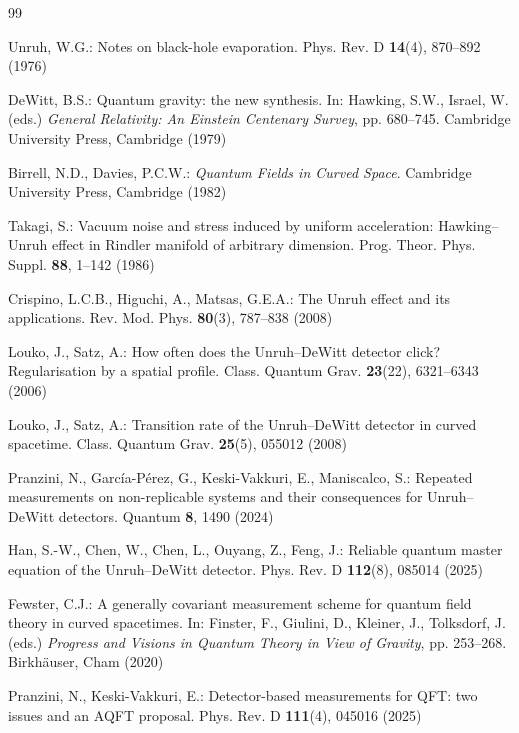 
\begin{thebibliography}{99}

Unruh, W.G.: Notes on black-hole evaporation. Phys. Rev. D \textbf{14}(4), 870--892 (1976)

DeWitt, B.S.: Quantum gravity: the new synthesis. In: Hawking, S.W., Israel, W. (eds.) \emph{General Relativity: An Einstein Centenary Survey}, pp. 680--745. Cambridge University Press, Cambridge (1979)

Birrell, N.D., Davies, P.C.W.: \emph{Quantum Fields in Curved Space}. Cambridge University Press, Cambridge (1982)

Takagi, S.: Vacuum noise and stress induced by uniform acceleration: Hawking--Unruh effect in Rindler manifold of arbitrary dimension. Prog. Theor. Phys. Suppl. \textbf{88}, 1--142 (1986)

Crispino, L.C.B., Higuchi, A., Matsas, G.E.A.: The Unruh effect and its applications. Rev. Mod. Phys. \textbf{80}(3), 787--838 (2008)

Louko, J., Satz, A.: How often does the Unruh--DeWitt detector click? Regularisation by a spatial profile. Class. Quantum Grav. \textbf{23}(22), 6321--6343 (2006)

Louko, J., Satz, A.: Transition rate of the Unruh--DeWitt detector in curved spacetime. Class. Quantum Grav. \textbf{25}(5), 055012 (2008)

Pranzini, N., Garc\'ia-P\'erez, G., Keski-Vakkuri, E., Maniscalco, S.: Repeated measurements on non-replicable systems and their consequences for Unruh--DeWitt detectors. Quantum \textbf{8}, 1490 (2024)

Han, S.-W., Chen, W., Chen, L., Ouyang, Z., Feng, J.: Reliable quantum master equation of the Unruh--DeWitt detector. Phys. Rev. D \textbf{112}(8), 085014 (2025)

Fewster, C.J.: A generally covariant measurement scheme for quantum field theory in curved spacetimes. In: Finster, F., Giulini, D., Kleiner, J., Tolksdorf, J. (eds.) \emph{Progress and Visions in Quantum Theory in View of Gravity}, pp. 253--268. Birkh\"auser, Cham (2020)

Pranzini, N., Keski-Vakkuri, E.: Detector-based measurements for QFT: two issues and an AQFT proposal. Phys. Rev. D \textbf{111}(4), 045016 (2025)


\end{thebibliography}
